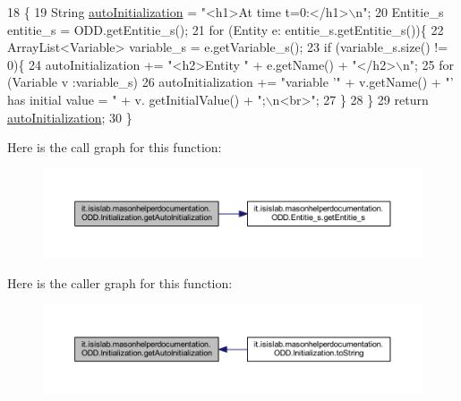\begin{DoxyCode}
18                                           \{
19         String \hyperlink{classit_1_1isislab_1_1masonhelperdocumentation_1_1_o_d_d_1_1_initialization_add84e104d84378945c02ac09899cb527}{autoInitialization} = \textcolor{stringliteral}{"<h1>At time t=0:</h1>\(\backslash\)n"};
20         Entitie\_s entitie\_s = ODD.getEntitie\_s();
21         \textcolor{keywordflow}{for} (Entity e: entitie\_s.getEntitie\_s())\{
22             ArrayList<Variable> variable\_s = e.getVariable\_s();     
23             \textcolor{keywordflow}{if} (variable\_s.size() != 0)\{
24                 autoInitialization += \textcolor{stringliteral}{"<h2>Entity "} + e.getName() + \textcolor{stringliteral}{"</h2>\(\backslash\)n"};
25                 \textcolor{keywordflow}{for} (Variable v :variable\_s)
26                     autoInitialization += \textcolor{stringliteral}{"variable '"} + v.getName() + \textcolor{stringliteral}{"' has initial value = "} + v.
      getInitialValue() + \textcolor{stringliteral}{";\(\backslash\)n<br>"};
27                 \}
28         \}
29         \textcolor{keywordflow}{return} \hyperlink{classit_1_1isislab_1_1masonhelperdocumentation_1_1_o_d_d_1_1_initialization_add84e104d84378945c02ac09899cb527}{autoInitialization};
30     \}
\end{DoxyCode}


Here is the call graph for this function\-:
\nopagebreak
\begin{figure}[H]
\begin{center}
\leavevmode
\includegraphics[width=350pt]{classit_1_1isislab_1_1masonhelperdocumentation_1_1_o_d_d_1_1_initialization_a1702d60449cb3ad4eb1dc783d84c3b24_cgraph}
\end{center}
\end{figure}




Here is the caller graph for this function\-:
\nopagebreak
\begin{figure}[H]
\begin{center}
\leavevmode
\includegraphics[width=350pt]{classit_1_1isislab_1_1masonhelperdocumentation_1_1_o_d_d_1_1_initialization_a1702d60449cb3ad4eb1dc783d84c3b24_icgraph}
\end{center}
\end{figure}


